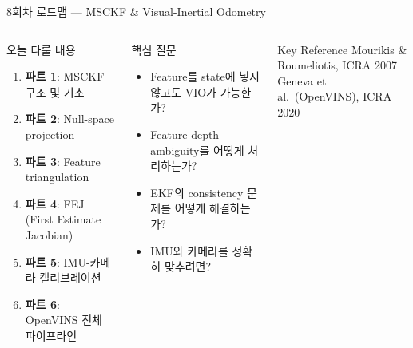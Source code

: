 \begin{frame}{8회차 로드맵 — MSCKF \& Visual-Inertial Odometry}
  \begin{columns}[T]
      \begin{block}{오늘 다룰 내용}
        \begin{enumerate}
          \item \textbf{파트 1}: MSCKF 구조 및 기초
          \item \textbf{파트 2}: Null-space projection
          \item \textbf{파트 3}: Feature triangulation
          \item \textbf{파트 4}: FEJ (First Estimate Jacobian)
          \item \textbf{파트 5}: IMU-카메라 캘리브레이션
          \item \textbf{파트 6}: OpenVINS 전체 파이프라인
        \end{enumerate}
      \end{block}
      \begin{alertblock}{핵심 질문}
        \begin{itemize}
          \item Feature를 state에 넣지 않고도 VIO가 가능한가?
          \item Feature depth ambiguity를 어떻게 처리하는가?
          \item EKF의 consistency 문제를 어떻게 해결하는가?
          \item IMU와 카메라를 정확히 맞추려면?
        \end{itemize}
      \end{alertblock}
      \begin{exampleblock}{Key Reference}
        Mourikis \& Roumeliotis, ICRA 2007\\
        Geneva et al.\ (OpenVINS), ICRA 2020
      \end{exampleblock}
  \end{columns}
\end{frame}

